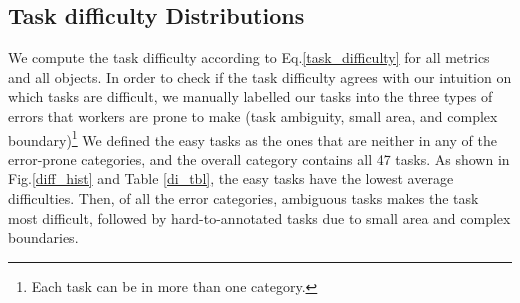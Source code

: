 \documentclass[12pt]{article}
\begin{document}
\subsection{Task difficulty Distributions}
We compute the task difficulty according to Eq.\ref{task_difficulty} for all metrics and all objects.  In order to check if the task difficulty agrees with our intuition on which tasks are difficult, we manually labelled our tasks into the three types of errors that workers are prone to make (task ambiguity, small area, and complex boundary)\footnote{Each task can be in more than one category.} We defined the easy tasks as the ones that are neither in any of the error-prone categories, and the overall category contains all 47 tasks.  As shown in Fig.\ref{diff_hist} and Table \ref{di_tbl}, the easy tasks have the lowest average difficulties. Then, of all the error categories, ambiguous tasks makes the task most difficult, followed by hard-to-annotated tasks due to small area and complex boundaries.
\begin{figure}[ht!]
\begin{floatrow}
\end{floatrow}
\end{figure}
\end{document}

